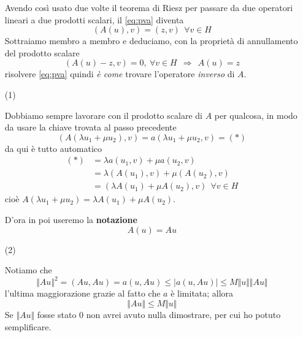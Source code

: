 \documentclass[10pt,a4paper,twoside,openright]{book}
\begin{document}
\begin{dimostrazione}
\begin{itemize}
              Avendo così usato due volte il teorema di Riesz per passare da due operatori lineari a due prodotti scalari, il \eqref{eq:pva} diventa
              \begin{equation*}
                  (A(u),v) =(z,v) \ \ \forall v\in H
              \end{equation*}
              Sottraiamo membro a membro e deduciamo, con la proprietà di annullamento del prodotto scalare
              \begin{equation*}
                  (A(u) -z,v) =0,\ \forall v\in H\ \ \Rightarrow \ \ \boxed{A(u) =z}
              \end{equation*}
              risolvere \eqref{eq:pva} quindi \textit{è come} trovare l'operatore \textit{inverso} di $A$.

        \item[(1)]

              Dobbiamo sempre lavorare con il prodotto scalare di $A$ per qualcosa, in modo da usare la chiave trovata al passo precedente
              \begin{equation*}
                  (A(\lambda u_{1} +\mu u_{2}),v) =a(\lambda u_{1} +\mu u_{2},v) =(*)
              \end{equation*}
              da qui è tutto automatico
              \begin{align*}
                  (*) & =\lambda a(u_{1},v) +\mu a(u_{2},v)                    \\
                      & =\lambda (A(u_{1}),v) +\mu (A(u_{2}),v)                \\
                      & =(\lambda A(u_{1}) +\mu A(u_{2}),v) \ \ \forall v\in H
              \end{align*}
              cioè $A(\lambda u_{1} +\mu u_{2}) =\lambda A(u_{1}) +\mu A(u_{2})$.

              D'ora in poi useremo la \textbf{notazione}
              \begin{equation*}
                  A(u) =Au
              \end{equation*}

        \item[(2)]

              Notiamo che
              \begin{equation*}
                  \Vert Au\Vert ^{2} =(Au,Au) =a(u,Au) \leqslant | a(u,Au)| \leqslant M\Vert u\Vert \Vert Au\Vert
              \end{equation*}
              l'ultima maggiorazione grazie al fatto che $a$ è limitata; allora
              \begin{equation*}
                  \Vert Au\Vert \leqslant M\Vert u\Vert
              \end{equation*}
              Se $\Vert Au\Vert $ fosse stato $0$ non avrei avuto nulla dimostrare, per cui ho potuto semplificare.


\end{itemize}
\end{dimostrazione}
\end{document}
